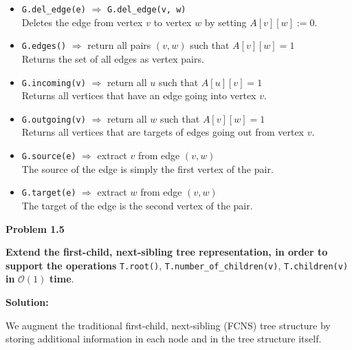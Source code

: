 \documentclass{article}
\begin{document}
\begin{itemize}
    \item \texttt{G.del\_edge(e)} $\Rightarrow$ \texttt{G.del\_edge(v, w)} \\
    Deletes the edge from vertex \(v\) to vertex \(w\) by setting \(A[v][w] := 0\).

    \item \texttt{G.edges()} $\Rightarrow$ return all pairs \((v, w)\) such that \(A[v][w] = 1\) \\
    Returns the set of all edges as vertex pairs.

    \item \texttt{G.incoming(v)} $\Rightarrow$ return all \(u\) such that \(A[u][v] = 1\) \\
    Returns all vertices that have an edge going into vertex \(v\).

    \item \texttt{G.outgoing(v)} $\Rightarrow$ return all \(w\) such that \(A[v][w] = 1\) \\
    Returns all vertices that are targets of edges going out from vertex \(v\).

    \item \texttt{G.source(e)} $\Rightarrow$ extract \(v\) from edge \((v, w)\) \\
    The source of the edge is simply the first vertex of the pair.

    \item \texttt{G.target(e)} $\Rightarrow$ extract \(w\) from edge \((v, w)\) \\
    The target of the edge is the second vertex of the pair.
\end{itemize}

\textbf{Problem 1.5}

\textbf{Extend the first-child, next-sibling tree representation, in order to support the operations} \texttt{T.root()}, \texttt{T.number\_of\_children(v)}, \texttt{T.children(v)} \textbf{in} $\mathcal{O}(1)$ \textbf{time}.

\textbf{Solution:}

We augment the traditional first-child, next-sibling (FCNS) tree structure by storing additional information in each node and in the tree structure itself.
\end{document}
